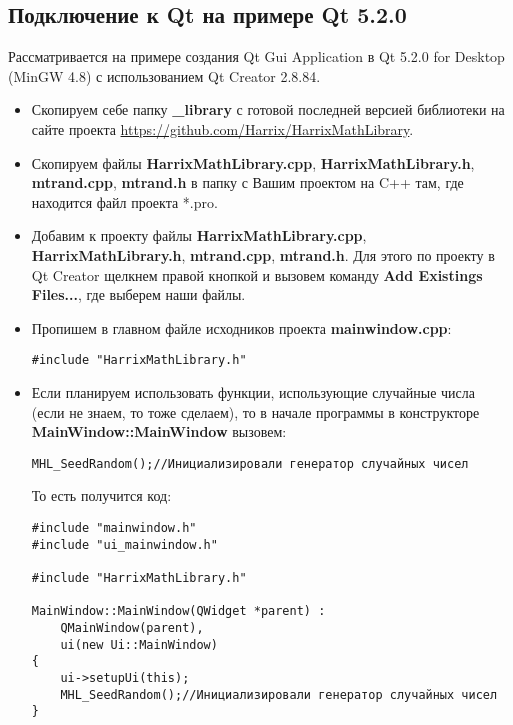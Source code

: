 \subsection{Подключение к Qt на примере Qt 5.2.0}

Рассматривается на примере создания Qt Gui Application в Qt 5.2.0 for Desktop (MinGW 4.8) с использованием Qt Creator 2.8.84.

\begin{itemize}
\item Скопируем себе папку \textbf{\_library} с готовой последней версией библиотеки на сайте проекта \href{https://github.com/Harrix/HarrixMathLibrary}{https://github.com/Harrix/HarrixMathLibrary}.

\item Скопируем файлы \textbf{HarrixMathLibrary.cpp}, \textbf{HarrixMathLibrary.h}, \textbf{mtrand.cpp}, \textbf{mtrand.h} в папку с Вашим проектом на C++ там, где находится файл проекта *.pro.

\item Добавим к проекту файлы \textbf{HarrixMathLibrary.cpp}, \textbf{HarrixMathLibrary.h}, \textbf{mtrand.cpp}, \textbf{mtrand.h}. Для этого по проекту в Qt Creator щелкнем правой кнопкой и вызовем команду \textbf{Add Existings Files...}, где выберем наши файлы.

\item Пропишем в главном файле исходников проекта \textbf{mainwindow.cpp}:
\begin{lstlisting}[label=install_01_qt,caption=Подключение библиотеки]
#include "HarrixMathLibrary.h"
\end{lstlisting}

\item Если планируем использовать функции, использующие случайные числа (если не знаем, то тоже сделаем), то в начале программы в конструкторе \textbf{MainWindow::MainWindow} вызовем:
\begin{lstlisting}[label=install_02_qt,caption=Инициализация генератора случайных чисел]
MHL_SeedRandom();//Инициализировали генератор случайных чисел
\end{lstlisting}

То есть получится код:
\begin{lstlisting}[label=install_03_qt,caption=Пример файла mainwindow.cpp с подключенной библиотекой]
#include "mainwindow.h"
#include "ui_mainwindow.h"

#include "HarrixMathLibrary.h"

MainWindow::MainWindow(QWidget *parent) :
    QMainWindow(parent),
    ui(new Ui::MainWindow)
{
    ui->setupUi(this);
    MHL_SeedRandom();//Инициализировали генератор случайных чисел    
}


\end{lstlisting}
\end{itemize}
